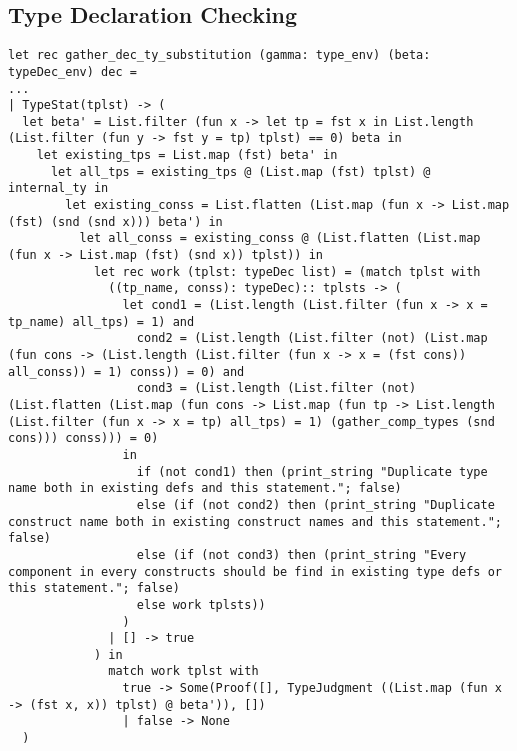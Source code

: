 \documentclass[a4paper,12pt]{article}
\begin{document}
	\subsection{Type Declaration Checking}
		\begin{lstlisting}
let rec gather_dec_ty_substitution (gamma: type_env) (beta: typeDec_env) dec =
...
| TypeStat(tplst) -> (
  let beta' = List.filter (fun x -> let tp = fst x in List.length (List.filter (fun y -> fst y = tp) tplst) == 0) beta in
    let existing_tps = List.map (fst) beta' in
      let all_tps = existing_tps @ (List.map (fst) tplst) @ internal_ty in
        let existing_conss = List.flatten (List.map (fun x -> List.map (fst) (snd (snd x))) beta') in
          let all_conss = existing_conss @ (List.flatten (List.map (fun x -> List.map (fst) (snd x)) tplst)) in
            let rec work (tplst: typeDec list) = (match tplst with
              ((tp_name, conss): typeDec):: tplsts -> (
                let cond1 = (List.length (List.filter (fun x -> x = tp_name) all_tps) = 1) and
                  cond2 = (List.length (List.filter (not) (List.map (fun cons -> (List.length (List.filter (fun x -> x = (fst cons)) all_conss)) = 1) conss)) = 0) and
                  cond3 = (List.length (List.filter (not) (List.flatten (List.map (fun cons -> List.map (fun tp -> List.length (List.filter (fun x -> x = tp) all_tps) = 1) (gather_comp_types (snd cons))) conss))) = 0)
                in
                  if (not cond1) then (print_string "Duplicate type name both in existing defs and this statement."; false)
                  else (if (not cond2) then (print_string "Duplicate construct name both in existing construct names and this statement."; false)
                  else (if (not cond3) then (print_string "Every component in every constructs should be find in existing type defs or this statement."; false)
                  else work tplsts))
                )
              | [] -> true
            ) in
              match work tplst with
                true -> Some(Proof([], TypeJudgment ((List.map (fun x -> (fst x, x)) tplst) @ beta')), [])
                | false -> None
  )
 
		\end{lstlisting}
	
\end{document}
